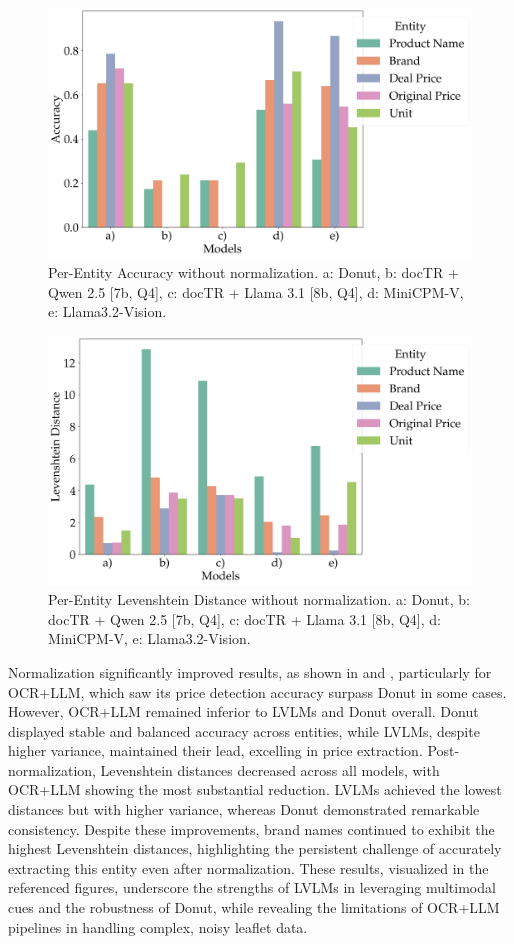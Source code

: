 \documentclass[11pt]{article}
\begin{document}
\begin{figure}[h!]
    \centering
    \includegraphics[width=0.8\linewidth]{figures/accuracies_raw.png}
    \caption{Per-Entity Accuracy without normalization. a: Donut, b: docTR + Qwen 2.5 [7b, Q4], c: docTR + Llama 3.1 [8b, Q4], d: MiniCPM-V, e: Llama3.2-Vision.}
    \label{fig:eval_final_acc_raw}
\end{figure}

\begin{figure}[h!]
    \centering
    \includegraphics[width=0.8\linewidth]{figures/levdistances_raw.png}
    \caption{Per-Entity Levenshtein Distance without normalization. a: Donut, b: docTR + Qwen 2.5 [7b, Q4], c: docTR + Llama 3.1 [8b, Q4], d: MiniCPM-V, e: Llama3.2-Vision.}
    \label{fig:eval_final_levdis_raw}
\end{figure}

Normalization significantly improved results, as shown in  and , particularly for OCR+LLM, which saw its price detection accuracy surpass Donut in some cases. However, OCR+LLM remained inferior to LVLMs and Donut overall. Donut displayed stable and balanced accuracy across entities, while LVLMs, despite higher variance, maintained their lead, excelling in price extraction. Post-normalization, Levenshtein distances decreased across all models, with OCR+LLM showing the most substantial reduction. LVLMs achieved the lowest distances but with higher variance, whereas Donut demonstrated remarkable consistency. Despite these improvements, brand names continued to exhibit the highest Levenshtein distances, highlighting the persistent challenge of accurately extracting this entity even after normalization. These results, visualized in the referenced figures, underscore the strengths of LVLMs in leveraging multimodal cues and the robustness of Donut, while revealing the limitations of OCR+LLM pipelines in handling complex, noisy leaflet data.
\end{document}
